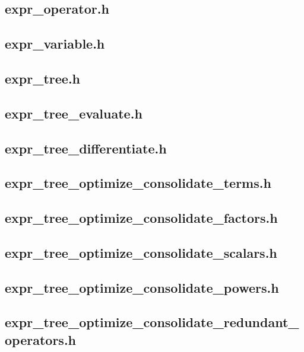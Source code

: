 \documentclass{article}
\begin{document}
\subsection{expr\_operator.h} \nopagebreak
\subsection{expr\_variable.h} \nopagebreak
\subsection{expr\_tree.h} \nopagebreak
\subsection{expr\_tree\_evaluate.h} \nopagebreak
\subsection{expr\_tree\_differentiate.h} \nopagebreak
\subsection{expr\_tree\_optimize\_consolidate\_terms.h} \nopagebreak
\subsection{expr\_tree\_optimize\_consolidate\_factors.h} \nopagebreak
\subsection{expr\_tree\_optimize\_consolidate\_scalars.h} \nopagebreak
\subsection{expr\_tree\_optimize\_consolidate\_powers.h} \nopagebreak
\subsection{expr\_tree\_optimize\_consolidate\_redundant\_operators.h} \nopagebreak
\end{document}
